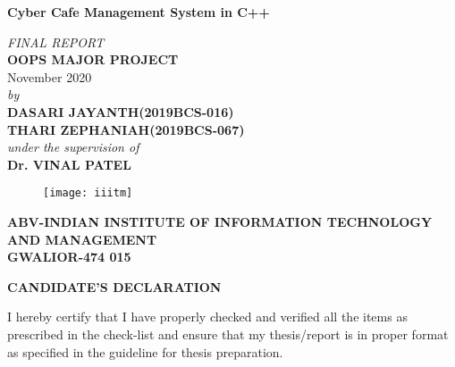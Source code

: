 \documentclass[12pt]{article}
\newlength{\defbaselineskip}
\newcommand{\setlinespacing}[1]%
           {\setlength{\baselineskip}{#1 \defbaselineskip}}
\begin{document}
\thispagestyle{empty}
\begin{titlepage}
\begin{center}
{\Large \textbf{Cyber Cafe Management System in C++}}\\[1.2cm]
\end{center}
\begin{center}
\vspace{0.1in}
{\Large \it FINAL REPORT} \\
\vspace{0.3in}
{\Large \bf OOPS MAJOR PROJECT} \\
November 2020\\
\vspace{0.3in}
{\large \it by\\}
\vspace{0.2in}
{\Large \bf DASARI JAYANTH(2019BCS-016) }\\
\vspace{0.2in}
{\Large \bf THARI ZEPHANIAH(2019BCS-067)}\\
\vspace{0.4in}
{\large \it under the supervision of\\}
\vspace{0.3in}
{\Large \bf Dr. VINAL PATEL}\\
\end {center}
\vspace{0.2in}
\begin{figure}[h]
\centerline{\texttt{[image: iiitm]}}
\end{figure}
\vspace{0.1in}
\begin{center}
{\Large \bf ABV-INDIAN INSTITUTE OF INFORMATION TECHNOLOGY AND MANAGEMENT\\
GWALIOR-474 015\\}
\end{center}
\end{titlepage}
\newpage
\setcounter{page}{1}
\setlinespacing{1}
\begin{center}
{\large \bf CANDIDATE'S DECLARATION}
\end{center}
I hereby certify that I have properly checked and verified all the items as prescribed in the check-list and ensure that my thesis/report is in proper format as specified in the guideline for thesis preparation. \\
\end{document}
